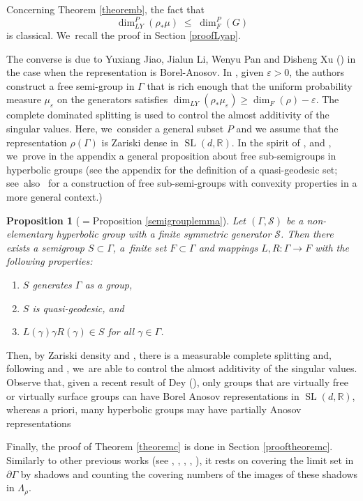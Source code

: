 \documentclass[10pt]{amsart}
\newtheorem{proposition}[theorem]{Proposition}
\newcommand{\R}{\mathbb{R}}
\newcommand{\cS}{\mathcal{S}}
\let\e\varepsilon
\let\G\Gamma
\let\La\Lambda
\DeclareMathOperator{\SL}{SL}
\begin{document}
Concerning Theorem \ref{theoremb}, the fact that
\begin{equation}\label{LyapleqFalc} \dim_{LY}^P(\rho_*\mu) \; \leq \; \dim_F^P (G) \end{equation} is classical. We~recall the proof in Section \ref{proofLyap}.

The converse is due to Yuxiang Jiao, Jialun Li, Wenyu Pan and Disheng Xu (\cite{JLPX23}) in the case when the representation is Borel-Anosov. In \cite{JLPX23}, given \(\e>0\), the authors construct a free semi-group in \(\G\) that is rich enough that the uniform probability measure \(\mu_\e \) on the generators satisfies \(\dim_{LY}(\rho_*\mu_\e) \ge \dim_F(\rho) -\e\). The complete dominated splitting is used to control the almost additivity of the singular values.
Here, we~consider a general subset \(P\) and we assume that the representation \(\rho(\G)\) is Zariski dense in \(\SL(d,\R)\). In the spirit of \cite{gouezel}, \cite{random} and \cite{JLPX23}, we~prove in the appendix a general proposition about free sub-semigroups in hyperbolic groups (see the appendix for the definition of a quasi-geodesic set; see~also~\cite{yang} for a construction of free sub-semi-groups with convexity properties in a more general context.)
\begin{proposition}[$={}$Proposition \ref{semigrouplemma}]
Let \((\Gamma,\cS)\) be a non-elementary hyperbolic group with a finite symmetric generator \(\cS\). Then there exists a semigroup \(S \subset \Gamma\), a~finite set \(F \subset \Gamma\) and mappings \(L,R:\Gamma \to F\) with the following properties:
\begin{enumerate}
\item \(S\) generates \(\Gamma\) as a group,
\item \(S\) is quasi-geodesic, and
\item \(L(\gamma)\gamma R(\gamma) \in S\) for all \(\gamma \in \Gamma\).
\end{enumerate}
\end{proposition}
Then, by Zariski density and \cite{AMS95}, there is a measurable complete splitting and, following \cite{Ben96} and \cite{2021breuillard-sert}, we~are able to control the almost additivity of the singular values. Observe that, given a recent result of Dey (\cite{Dey24}), only groups that are virtually free or virtually surface groups can have Borel Anosov representations in \(\SL (d, \R)\), whereas a priori, many hyperbolic groups may have partially Anosov representations

Finally, the proof of Theorem \ref{theoremc} is done in Section \ref{prooftheoremc}. Similarly to other previous works (see \cite{Zha97}, \cite{BCH10}, \cite{PSW21}, \cite{GMT19}, \cite{FS20}), it rests on covering the limit set in \(\partial \G \) by shadows and counting the covering numbers of the images of these shadows in \(\La_\rho \).
\end{document}
